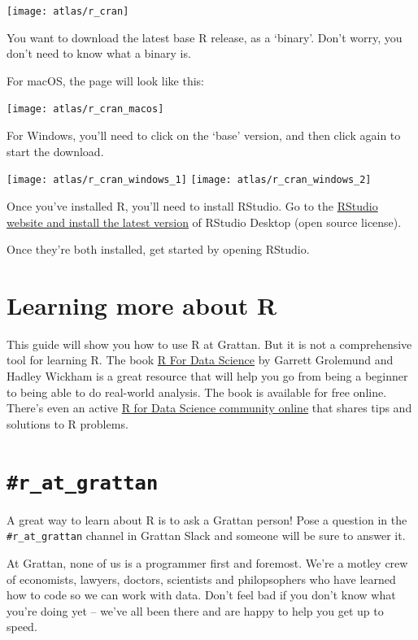 \documentclass[
]{book}
\begin{document}
\texttt{[image: atlas/r\_cran]}

You want to download the latest base R release, as a `binary'. Don't worry, you don't need to know what a binary is.

For macOS, the page will look like this:

\texttt{[image: atlas/r\_cran\_macos]}

For Windows, you'll need to click on the `base' version, and then click again to start the download.

\texttt{[image: atlas/r\_cran\_windows\_1]}
\texttt{[image: atlas/r\_cran\_windows\_2]}

Once you've installed R, you'll need to install RStudio. Go to the \href{https://www.rstudio.com/products/rstudio/download/\#download}{RStudio website and install the latest version} of RStudio Desktop (open source license).

Once they're both installed, get started by opening RStudio.

\hypertarget{learning-more-about-r}{%
\section{Learning more about R}\label{learning-more-about-r}}

This guide will show you how to use R at Grattan. But it is not a comprehensive tool for learning R. The book \href{https://r4ds.had.co.nz}{R For Data Science} by Garrett Grolemund and Hadley Wickham is a great resource that will help you go from being a beginner to being able to do real-world analysis. The book is available for free online. There's even an active \href{https://www.rfordatasci.com}{R for Data Science community online} that shares tips and solutions to R problems.

\hypertarget{r_at_grattan}{%
\section{\texorpdfstring{\texttt{\#r\_at\_grattan}}{\#r\_at\_grattan}}\label{r_at_grattan}}

A great way to learn about R is to ask a Grattan person! Pose a question in the \texttt{\#r\_at\_grattan} channel in Grattan Slack and someone will be sure to answer it.

At Grattan, none of us is a programmer first and foremost. We're a motley crew of economists, lawyers, doctors, scientists and philopsophers who have learned how to code so we can work with data. Don't feel bad if you don't know what you're doing yet -- we've all been there and are happy to help you get up to speed.
\end{document}
